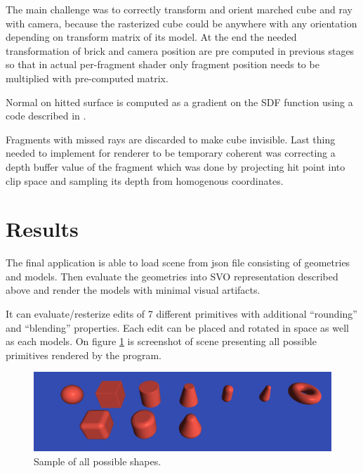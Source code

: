 \documentclass[11pt, a4paper]{article}
\renewcommand{\uv}[1]{``#1''}
\begin{document}
The main challenge was to correctly transform and orient marched cube and ray with camera, because the rasterized cube could be anywhere with any orientation depending on transform matrix of its model.
At the end the needed transformation of brick and camera position are pre computed in previous stages so that in actual per-fragment shader only fragment position needs to be multiplied with pre-computed matrix.

Normal on hitted surface is computed as a gradient on the SDF function using a code described in \cite{Quilez_normals}.

Fragments with missed rays are discarded to make cube invisible.
Last thing needed to implement for renderer to be temporary coherent was correcting a depth buffer value of the fragment which was done by projecting hit point into clip space and sampling its depth from homogenous coordinates.


\section{Results}

The final application is able to load scene from json file consisting of geometries and models. Then evaluate the geometries into SVO representation described above and render the models with minimal visual artifacts.

It can evaluate/resterize edits of 7 different primitives with additional \uv{rounding} and \uv{blending} properties.
Each edit can be placed and rotated in space as well as each models.
On figure \ref{primitives_scene} is screenshot of scene presenting all possible primitives rendered by the program.
\begin{figure}[ht]
    \centering
    \includegraphics[width=\textwidth]{primitives_scene.png}
    \caption{Sample of all possible shapes.}
    \label{primitives_scene}
\end{figure}
\end{document}
